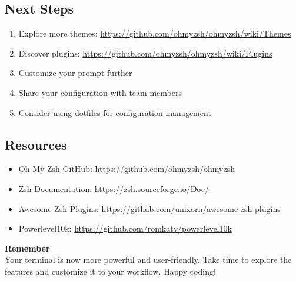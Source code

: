 \documentclass{article}
\begin{document}
\subsection{Next Steps}

\begin{enumerate}
    \item Explore more themes: \url{https://github.com/ohmyzsh/ohmyzsh/wiki/Themes}
    \item Discover plugins: \url{https://github.com/ohmyzsh/ohmyzsh/wiki/Plugins}
    \item Customize your prompt further
    \item Share your configuration with team members
    \item Consider using dotfiles for configuration management
\end{enumerate}

\subsection{Resources}

\begin{itemize}
    \item Oh My Zsh GitHub: \url{https://github.com/ohmyzsh/ohmyzsh}
    \item Zsh Documentation: \url{https://zsh.sourceforge.io/Doc/}
    \item Awesome Zsh Plugins: \url{https://github.com/unixorn/awesome-zsh-plugins}
    \item Powerlevel10k: \url{https://github.com/romkatv/powerlevel10k}
\end{itemize}

\begin{infobox}
\textbf{Remember}\\
Your terminal is now more powerful and user-friendly. Take time to explore the features and customize it to your workflow. Happy coding!
\end{infobox}
\end{document}
